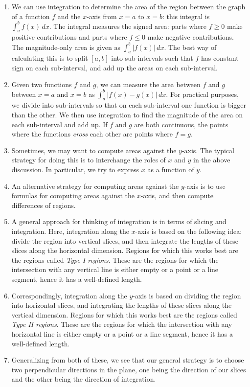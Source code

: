 \documentclass[10pt]{amsart}
\begin{document}
\begin{enumerate}

\item We can use integration to determine the area of the region
  between the graph of a function $f$ and the $x$-axis from $x = a$ to
  $x = b$: this integral is $\int_a^b f(x) \, dx$. The integral
  measures the signed area: parts where $f \ge 0$ make positive
  contributions and parts where $f \le 0$ make negative
  contributions. The magnitude-only area is given as $\int_a^b |f(x)|
  \, dx$. The best way of calculating this is to split $[a,b]$ into
  sub-intervals such that $f$ has constant sign on each sub-interval,
  and add up the areas on each sub-interval.
\item Given two functions $f$ and $g$, we can measure the area between
  $f$ and $g$ between $x = a$ and $x = b$ as $\int_a^b |f(x) - g(x)|
  \,dx$. For practical purposes, we divide into sub-intervals so that
  on each sub-interval one function is bigger than the other. We then
  use integration to find the magnitude of the area on each
  sub-interval and add up. If $f$ and $g$ are both continuous, the
  points where the functions {\em cross} each other are points where
  $f = g$.
\item Sometimes, we may want to compute areas against the
  $y$-axis. The typical strategy for doing this is to interchange the
  roles of $x$ and $y$ in the above discussion. In particular, we try
  to express $x$ as a function of $y$.
\item An alternative strategy for computing areas against the $y$-axis
  is to use formulas for computing areas against the $x$-axis, and
  then compute differences of regions.
\item A general approach for thinking of integration is in terms of
  slicing and integration. Here, integration along the $x$-axis is
  based on the following idea: divide the region into vertical slices,
  and then integrate the lengths of these slices along the horizontal
  dimension. Regions for which this works best are the regions called
  {\em Type I regions}. These are the regions for which the
  intersection with any vertical line is either empty or a point or a
  line segment, hence it has a well-defined length.
\item Correspondingly, integration along the $y$-axis is based on
  dividing the region into horizontal slices, and integrating the
  lengths of these slices along the vertical dimension. Regions for
  which this works best are the regions called {\em Type II regions}.
  These are the regions for which the intersection with any horizontal
  line is either empty or a point or a line segment, hence it has a
  well-defined length.
\item Generalizing from both of these, we see that our general
  strategy is to choose two perpendicular directions in the plane, one
  being the direction of our slices and the other being the direction
  of integration.
\end{enumerate}
\end{document}
